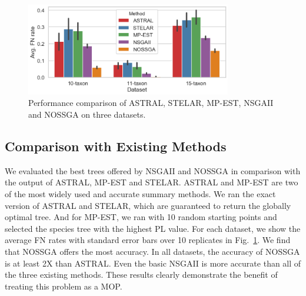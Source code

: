 \begin{figure}
	\begin{adjustwidth}{0cm}{0cm}
		\centering
		\includegraphics[width=0.8\textwidth]{Figure/all_dataset_compare}
		\caption{Performance comparison of ASTRAL, STELAR, MP-EST, NSGAII and NOSSGA on three datasets. 
		} \label{fig:compare_exisitng_methods}
	\end{adjustwidth}
\end{figure}

\subsection{Comparison with Existing Methods}
We evaluated the best trees offered by NSGAII and NOSSGA in comparison with the output of ASTRAL, MP-EST and STELAR. ASTRAL and MP-EST are two of the most widely used and accurate
summary methods. We ran the exact version of ASTRAL and STELAR, which are guaranteed to return the globally optimal tree. And for MP-EST, we ran with 10 random starting points and selected the species tree with the
highest PL value. For each dataset, we show the average FN rates with standard error bars over 10 replicates in Fig.~\ref{fig:compare_exisitng_methods}. We find that NOSSGA offers the most accuracy. In all datasets, the accuracy of NOSSGA is at least 2X than ASTRAL. Even the basic NSGAII is more accurate than all of the three existing methods. These results clearly demonstrate the benefit of treating this problem as a MOP. 



